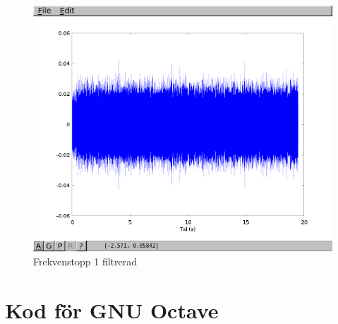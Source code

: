 \documentclass[a4paper,12pt,fleqn]{article}
\begin{document}
\begin{figure}[htp]
  \begin{center}
  \includegraphics[keepaspectratio=true,width=\linewidth]{topp3_filter.png}  %
  \end{center}
  \caption{Frekvenstopp 1 filtrerad} %
  \label{fig:topp3_filter}
\end{figure}

\newpage
\section{Kod för GNU Octave}


\end{document}
